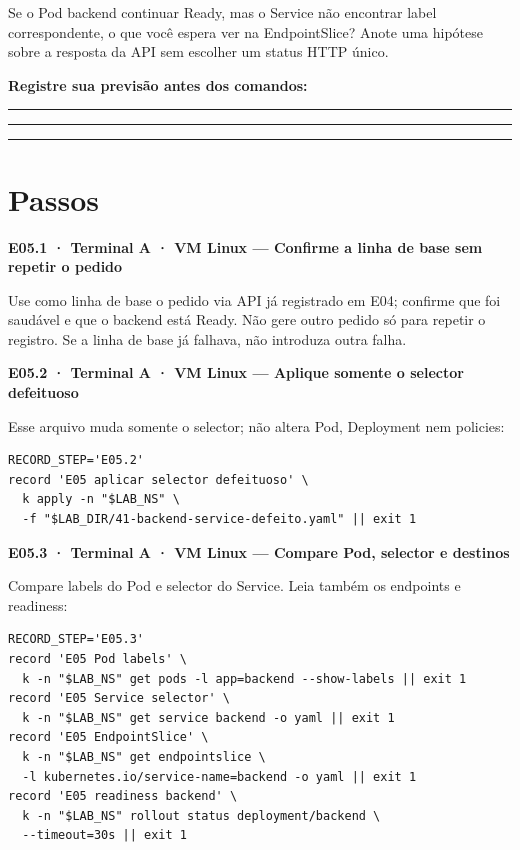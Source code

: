 \documentclass[12pt,openany,oneside,a4paper,chapter=TITLE,english,brazil]{abntex2}
\begin{document}
Se o Pod backend continuar Ready, mas o Service não encontrar label correspondente, o que você espera ver na EndpointSlice? Anote uma hipótese sobre a resposta da API sem escolher um status HTTP único.

\textbf{Registre sua previsão antes dos comandos:}

\noindent\rule{\textwidth}{0.35pt}\par\vspace{0.55cm}
\noindent\rule{\textwidth}{0.35pt}\par\vspace{0.55cm}
\noindent\rule{\textwidth}{0.35pt}

\section*{Passos}\label{passos-4}

\textbf{E05.1 · Terminal A · VM Linux --- Confirme a linha de base sem repetir o pedido}

Use como linha de base o pedido via API já registrado em E04; confirme que foi saudável e que o backend está Ready. Não gere outro pedido só para repetir o registro. Se a linha de base já falhava, não introduza outra falha.

\textbf{E05.2 · Terminal A · VM Linux --- Aplique somente o selector defeituoso}

Esse arquivo muda somente o selector; não altera Pod, Deployment nem policies:

\begin{verbatim}
RECORD_STEP='E05.2'
record 'E05 aplicar selector defeituoso' \
  k apply -n "$LAB_NS" \
  -f "$LAB_DIR/41-backend-service-defeito.yaml" || exit 1
\end{verbatim}

\textbf{E05.3 · Terminal A · VM Linux --- Compare Pod, selector e destinos}

Compare labels do Pod e selector do Service. Leia também os endpoints e readiness:

\begin{verbatim}
RECORD_STEP='E05.3'
record 'E05 Pod labels' \
  k -n "$LAB_NS" get pods -l app=backend --show-labels || exit 1
record 'E05 Service selector' \
  k -n "$LAB_NS" get service backend -o yaml || exit 1
record 'E05 EndpointSlice' \
  k -n "$LAB_NS" get endpointslice \
  -l kubernetes.io/service-name=backend -o yaml || exit 1
record 'E05 readiness backend' \
  k -n "$LAB_NS" rollout status deployment/backend \
  --timeout=30s || exit 1
\end{verbatim}
\end{document}
